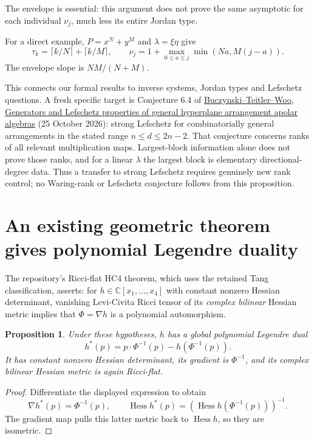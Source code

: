 \documentclass[11pt]{article}
\newtheorem{proposition}{Proposition}
\begin{document}
The envelope is essential: this argument does not prove the same
asymptotic for each individual $\nu_j$, much less its entire Jordan type.

For a direct example, $P=x^N+y^M$ and $\lambda=\xi\eta$ give
\[
 \tau_k=\lceil k/N\rceil+\lceil k/M\rceil,\qquad
 \nu_j=1+\max_{0\le a\le j}\min(Na,M(j-a)).
\]
The envelope slope is $NM/(N+M)$.

This connects our formal results to inverse systems, Jordan types and
Lefschetz questions. A fresh specific target is Conjecture 6.4 of
\href{https://arxiv.org/abs/2610.34517}{Buczynski--Teitler--Woo,
Generators and Lefschetz properties of general hyperplane arrangement
apolar algebras} (25 October 2026): strong Lefschetz for combinatorially
general arrangements in the stated range $n\le d\le2n-2$.
That conjecture concerns ranks of all relevant multiplication maps.
Largest-block information alone does not prove those ranks, and for a
linear $\lambda$ the largest block is elementary directional-degree data.
Thus a transfer to strong Lefschetz requires genuinely new rank control;
no Waring-rank or Lefschetz conjecture follows from this proposition.

\section{An existing geometric theorem gives polynomial Legendre duality}

The repository's Ricci-flat HC4 theorem, which uses the retained Tang
classification, asserts: for $h\in\mathbb C[x_1,\ldots,x_4]$ with constant
nonzero Hessian determinant, vanishing Levi-Civita Ricci tensor of its
\emph{complex bilinear} Hessian metric implies that
$\Phi=\nabla h$ is a polynomial automorphism.

\begin{proposition}
Under these hypotheses, $h$ has a global polynomial Legendre dual
\[
 h^*(p)=p\cdot\Phi^{-1}(p)-h(\Phi^{-1}(p)).
\]
It has constant nonzero Hessian determinant, its gradient is
$\Phi^{-1}$, and its complex bilinear Hessian metric is again Ricci-flat.
\end{proposition}
\begin{proof}
Differentiate the displayed expression to obtain
\[\nabla h^*(p)=\Phi^{-1}(p),\qquad
\operatorname{Hess}h^*(p)=
(\operatorname{Hess}h(\Phi^{-1}(p)))^{-1}.\]
The gradient map pulls this latter metric back to
$\operatorname{Hess}h$, so they are isometric.
\end{proof}
\end{document}
